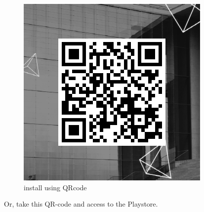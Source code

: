 \documentclass[conference]{IEEEtran}
\begin{document}
\begin{figure}[htbp]
\begin{center}
    \includegraphics[scale=0.4]{img_qrcode}
    \caption{install using QRcode} 
\end{center}
\end{figure}

Or, take this QR-code and access to the Playstore.\\\\\\\\\\\\\\\\
\end{document}
